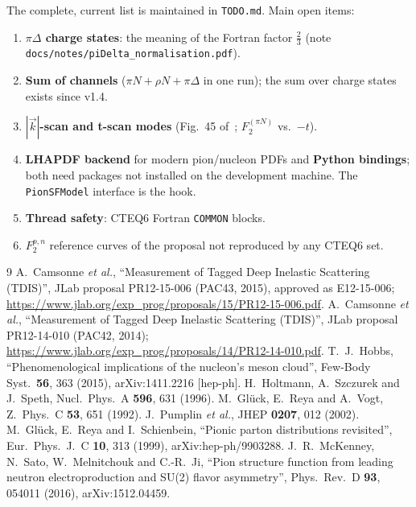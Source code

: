 \documentclass[11pt,a4paper]{article}
\newcommand{\code}[1]{\texttt{#1}}
\begin{document}
The complete, current list is maintained in \texttt{TODO.md}.
Main open items:

\begin{enumerate}
\item \textbf{$\pi\Delta$ charge states}: the meaning of the Fortran
  factor $\tfrac23$ (note \texttt{docs/notes/piDelta\_normalisation.pdf}).
\item \textbf{Sum of channels} ($\pi N+\rho N+\pi\Delta$ in one run); the
  sum over charge states exists since v1.4.
\item \textbf{$|\vec k|$-scan and t-scan modes} (Fig.~45 of~\cite{TDIS15};
  $F_2^{(\pi N)}$ vs.\ $-t$).
\item \textbf{LHAPDF backend} for modern pion/nucleon PDFs and
  \textbf{Python bindings}; both need packages not installed on the
  development machine.  The \code{PionSFModel} interface is the hook.
\item \textbf{Thread safety}: CTEQ6 Fortran \texttt{COMMON} blocks.
\item \textbf{$F_2^{p,n}$} reference curves of the proposal not reproduced
  by any CTEQ6 set.
\end{enumerate}

\begin{thebibliography}{9}
 A.~Camsonne \textit{et al.}, ``Measurement of Tagged
  Deep Inelastic Scattering (TDIS)'', JLab proposal PR12-15-006 (PAC43,
  2015), approved as E12-15-006;
  \url{https://www.jlab.org/exp_prog/proposals/15/PR12-15-006.pdf}.
 A.~Camsonne \textit{et al.}, ``Measurement of Tagged
  Deep Inelastic Scattering (TDIS)'', JLab proposal PR12-14-010 (PAC42,
  2014); \url{https://www.jlab.org/exp_prog/proposals/14/PR12-14-010.pdf}.
 T.~J.~Hobbs, ``Phenomenological implications of the
  nucleon's meson cloud'', Few-Body Syst.\ \textbf{56}, 363 (2015),
  arXiv:1411.2216 [hep-ph].
 H.~Holtmann, A.~Szczurek and J.~Speth,
  Nucl.\ Phys.\ A \textbf{596}, 631 (1996).
 M.~Gl\"uck, E.~Reya and A.~Vogt, Z.\ Phys.\ C
  \textbf{53}, 651 (1992).
 J.~Pumplin \textit{et al.}, JHEP \textbf{0207}, 012 (2002).
 M.~Gl\"uck, E.~Reya and I.~Schienbein, ``Pionic parton
  distributions revisited'', Eur.\ Phys.\ J.\ C \textbf{10}, 313 (1999),
  arXiv:hep-ph/9903288.
 J.~R.~McKenney, N.~Sato, W.~Melnitchouk and C.-R.~Ji,
  ``Pion structure function from leading neutron electroproduction and
  SU(2) flavor asymmetry'', Phys.\ Rev.\ D \textbf{93}, 054011 (2016),
  arXiv:1512.04459.
\end{thebibliography}

\end{document}
